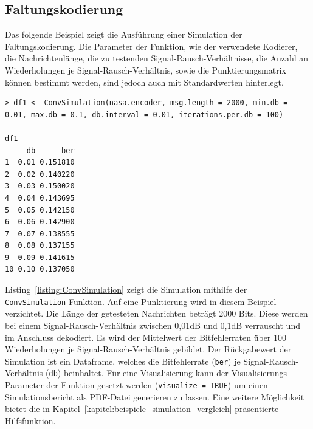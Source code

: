 \subsection{Faltungskodierung}
\label{kapitel:beispiele_simulation_faltungskodierung}
Das folgende Beispiel zeigt die Ausführung einer Simulation der Faltungskodierung. Die Parameter der Funktion, wie der verwendete Kodierer, die Nachrichtenlänge, die zu testenden Signal-Rausch-Verhältnisse, die Anzahl an Wiederholungen je Signal-Rausch-Verhältnis, sowie die Punktierungsmatrix können bestimmt werden, sind jedoch auch mit Standardwerten hinterlegt.
\begin{lstlisting}[caption=Simulation der Faltungskodierung, label={listing:ConvSimulation}, float=!th]
> df1 <- ConvSimulation(nasa.encoder, msg.length = 2000, min.db = 0.01, max.db = 0.1, db.interval = 0.01, iterations.per.db = 100)

df1
     db      ber
1  0.01 0.151810
2  0.02 0.140220
3  0.03 0.150020
4  0.04 0.143695
5  0.05 0.142150
6  0.06 0.142900
7  0.07 0.138555
8  0.08 0.137155
9  0.09 0.141615
10 0.10 0.137050
\end{lstlisting}
Listing~\ref{listing:ConvSimulation} zeigt die Simulation mithilfe der \texttt{ConvSimulation}-Funktion. Auf eine Punktierung wird in diesem Beispiel verzichtet. Die Länge der getesteten Nachrichten beträgt 2000 Bits. Diese werden bei einem Signal-Rausch-Verhältnis zwischen 0,01dB und 0,1dB verrauscht und im Anschluss dekodiert. Es wird der Mittelwert der Bitfehlerraten über 100 Wiederholungen je Signal-Rausch-Verhältnis gebildet. Der Rückgabewert der Simulation ist ein Dataframe, welches die Bitfehlerrate (\texttt{ber}) je Signal-Rausch-Verhältnis (\texttt{db}) beinhaltet. Für eine Visualisierung kann der Visualisierungs-Parameter der Funktion gesetzt werden (\texttt{visualize = TRUE}) um einen Simulationsbericht als PDF-Datei generieren zu lassen. Eine weitere Möglichkeit bietet die in Kapitel~\ref{kapitel:beispiele_simulation_vergleich} präsentierte Hilfsfunktion.

